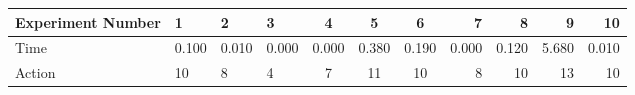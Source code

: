 \documentclass[8pt]{article}
\begin{document}
\begin{landscape}
\begin{tabular}{ | l | l | l | l | c | c | c | r | r | r | r | }
 \hline 
Experiment Number & 1 & 2 & 3 & 4 & 5 & 6 & 7 & 8 & 9 & 10\\ \hline
Time & 0.100 & 0.010 & 0.000 & 0.000 & 0.380 & 0.190 & 0.000 & 0.120 & 5.680 & 0.010\\ \hline
Action & 10 & 8 & 4 & 7 & 11 & 10 & 8 & 10 & 13 & 10\\ \hline\end{tabular}
\end{landscape}
\end{document}
